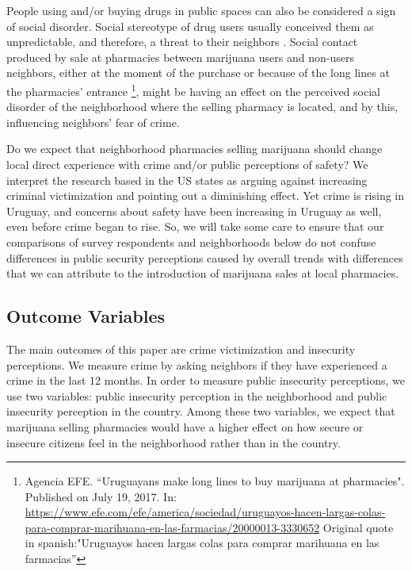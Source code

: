 \documentclass[11pt]{article}
\begin{document}
People using and/or buying drugs in public spaces can also be considered a sign of social disorder. Social stereotype of drug users usually conceived them as unpredictable, and therefore, a threat to their neighbors \citep{bennett1994determinants}. Social contact produced by sale at pharmacies between marijuana users and non-users neighbors, either at the  moment of the purchase or because of the long lines at the pharmacies' entrance \footnote{Agencia EFE. ``Uruguayans make long lines to buy marijuana at pharmacies". Published on July 19, 2017. In: \url{https://www.efe.com/efe/america/sociedad/uruguayos-hacen-largas-colas-para-comprar-marihuana-en-las-farmacias/20000013-3330652} Original quote in spanish:"Uruguayos hacen largas colas para comprar marihuana en las farmacias''}, might be having an effect on the perceived social disorder of the neighborhood where the selling pharmacy is located, and by this, influencing neighbors' fear of crime.

Do we expect that neighborhood pharmacies selling marijuana should change local direct experience with crime and/or public perceptions of safety? We interpret the research based in the US states as arguing against increasing criminal victimization and pointing out a diminishing effect. Yet crime is rising in Uruguay, and concerns about safety have been increasing in Uruguay as well, even before crime began to rise. So, we will take some care to ensure that our comparisons of survey respondents and neighborhoods below do not confuse differences in public security perceptions caused by overall trends with differences that we can attribute to the introduction of marijuana sales at local pharmacies.

\subsection{Outcome Variables}
The main outcomes of this paper are crime victimization and insecurity perceptions. We measure crime by asking neighbors if they have experienced a crime in the last 12 months. In order to measure public insecurity perceptions, we use two variables: public insecurity perception in the neighborhood and public insecurity perception in the country. Among these two variables, we expect that marijuana selling pharmacies would have a higher effect on how secure or insecure citizens feel in the neighborhood rather than in the country.
\end{document}
